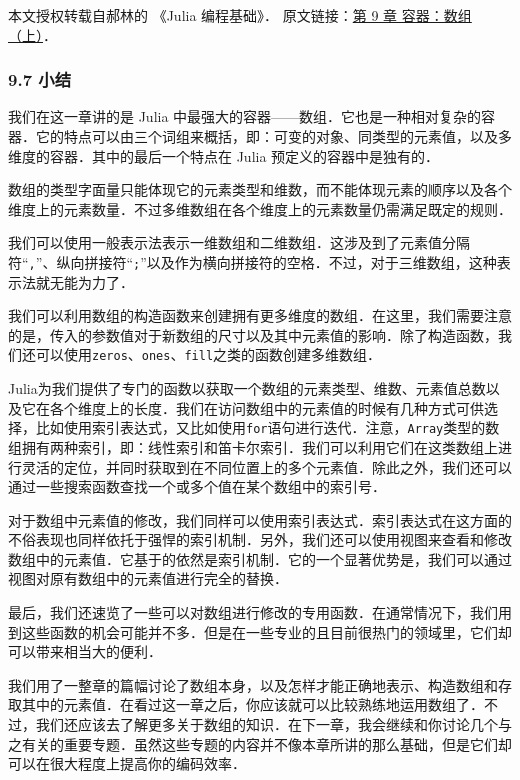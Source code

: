 
本文授权转载自郝林的 《Julia 编程基础》． 原文链接：\href{https://github.com/hyper0x/JuliaBasics/blob/master/book/ch09.md}{第 9 章 容器：数组（上）}．


\subsubsection{9.7 小结}

我们在这一章讲的是 Julia 中最强大的容器——数组．它也是一种相对复杂的容器．它的特点可以由三个词组来概括，即：可变的对象、同类型的元素值，以及多维度的容器．其中的最后一个特点在 Julia 预定义的容器中是独有的．

数组的类型字面量只能体现它的元素类型和维数，而不能体现元素的顺序以及各个维度上的元素数量．不过多维数组在各个维度上的元素数量仍需满足既定的规则．

我们可以使用一般表示法表示一维数组和二维数组．这涉及到了元素值分隔符“\verb|,|”、纵向拼接符“\verb|;|”以及作为横向拼接符的空格．不过，对于三维数组，这种表示法就无能为力了．

我们可以利用数组的构造函数来创建拥有更多维度的数组．在这里，我们需要注意的是，传入的参数值对于新数组的尺寸以及其中元素值的影响．除了构造函数，我们还可以使用\verb|zeros|、\verb|ones|、\verb|fill|之类的函数创建多维数组．

Julia为我们提供了专门的函数以获取一个数组的元素类型、维数、元素值总数以及它在各个维度上的长度．我们在访问数组中的元素值的时候有几种方式可供选择，比如使用索引表达式，又比如使用\verb|for|语句进行迭代．注意，\verb|Array|类型的数组拥有两种索引，即：线性索引和笛卡尔索引．我们可以利用它们在这类数组上进行灵活的定位，并同时获取到在不同位置上的多个元素值．除此之外，我们还可以通过一些搜索函数查找一个或多个值在某个数组中的索引号．

对于数组中元素值的修改，我们同样可以使用索引表达式．索引表达式在这方面的不俗表现也同样依托于强悍的索引机制．另外，我们还可以使用视图来查看和修改数组中的元素值．它基于的依然是索引机制．它的一个显著优势是，我们可以通过视图对原有数组中的元素值进行完全的替换．

最后，我们还速览了一些可以对数组进行修改的专用函数．在通常情况下，我们用到这些函数的机会可能并不多．但是在一些专业的且目前很热门的领域里，它们却可以带来相当大的便利．

我们用了一整章的篇幅讨论了数组本身，以及怎样才能正确地表示、构造数组和存取其中的元素值．在看过这一章之后，你应该就可以比较熟练地运用数组了．不过，我们还应该去了解更多关于数组的知识．在下一章，我会继续和你讨论几个与之有关的重要专题．虽然这些专题的内容并不像本章所讲的那么基础，但是它们却可以在很大程度上提高你的编码效率．